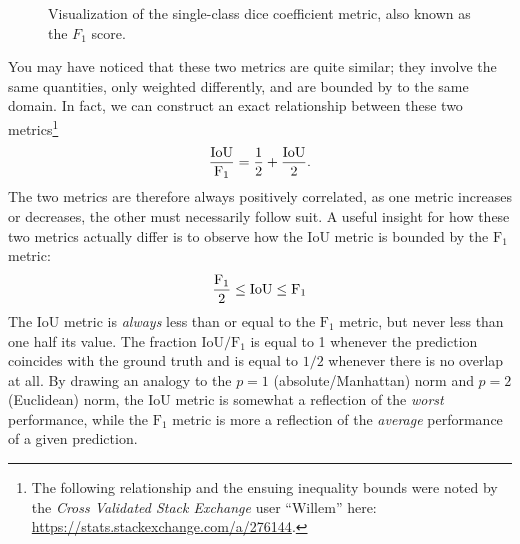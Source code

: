 \begin{figure}[H]
  \centering
  
  \caption{%
    Visualization of the single-class dice coefficient metric, also known as the $F_1$ score.
  }%
  \label{fig:dice-coefficient}
\end{figure}

You may have noticed that these two metrics are quite similar; they involve the same quantities, only weighted differently, and are bounded by to the same domain.
In fact, we can construct an exact relationship between these two metrics\footnote{The following relationship and the ensuing inequality bounds were noted by the \textit{Cross Validated Stack Exchange} user \enquote{Willem} here: \url{https://stats.stackexchange.com/a/276144}.}
%
\begin{equation*}
  \frac{%
    \mathrm{IoU}
  }{%
    \mathrm{F_1}
  }
  =
  \frac{1}{2}
  +
  \frac{%
    \mathrm{IoU}
  }{%
    2
  }.
\end{equation*}
%
The two metrics are therefore always positively correlated, as one metric increases or decreases, the other must necessarily follow suit.
A useful insight for how these two metrics actually differ is to observe how the IoU metric is bounded by the $\mathrm{F_1}$ metric:
%
\begin{equation*}
    \frac{%
      \mathrm{F_1}
    }{%
      2
    }
  \leq
    \mathrm{IoU}
  \leq
    \mathrm{F_1}
\end{equation*}
%
The IoU metric is \textit{always} less than or equal to the $\mathrm{F_1}$ metric, but never less than one half its value.
The fraction $\mathrm{IoU} / \mathrm{F_1}$ is equal to 1 whenever the prediction coincides with the ground truth and is equal to $1/2$ whenever there is no overlap at all.
By drawing an analogy to the $p = 1$ (absolute/Manhattan) norm and $p = 2$ (Euclidean) norm, the $\mathrm{IoU}$ metric is somewhat a reflection of the \textit{worst} performance, while the $\mathrm{F_1}$ metric is more a reflection of the \textit{average} performance of a given prediction.
